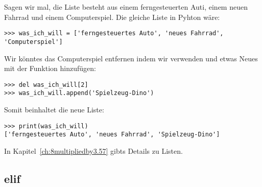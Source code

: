 
\noindent
Sagen wir mal, die Liste besteht aus einem ferngesteuerten Auti, einem neuen Fahrrad und einem Computerspiel. Die gleiche Liste in Pyhton wäre:

\begin{Verbatim}[frame=single]
>>> was_ich_will = ['ferngesteuertes Auto', 'neues Fahrrad', 'Computerspiel']
\end{Verbatim}

\noindent
Wir könntes das Computerspiel entfernen indem wir  verwenden und etwas Neues mit der Funktion  hinzufügen:

\begin{Verbatim}[frame=single]
>>> del was_ich_will[2]
>>> was_ich_will.append('Spielzeug-Dino')
\end{Verbatim}

\noindent
Somit beinhaltet die neue Liste:

\begin{Verbatim}[frame=single]
>>> print(was_ich_will)
['ferngesteuertes Auto', 'neues Fahrrad', 'Spielzeug-Dino']
\end{Verbatim}

\noindent
In Kapitel~\ref{ch:8multipliedby3.57} gibts Details zu Listen.

\subsection*{elif}

